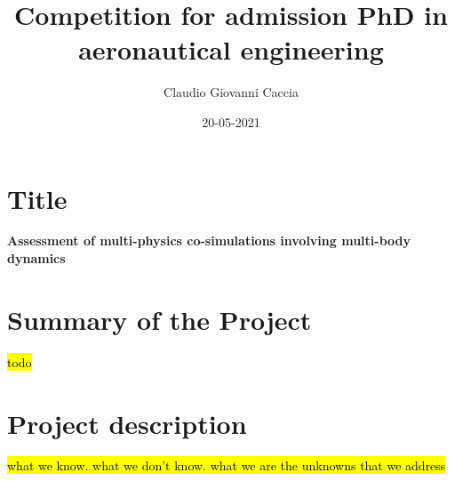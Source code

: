 \documentclass[a4paper]{article}
\title{Competition for admission PhD in \\ aeronautical engineering}
\author{Claudio Giovanni Caccia}
\date{20-05-2021}
\begin{document}
\maketitle

\section*{Title}

\textbf{Assessment of multi-physics co-simulations involving multi-body dynamics}

\section*{Summary of the Project}

\hl{todo}


\section*{Project description}





\hl{what we know. what we don't know. what we are the unknowns that we address}



\end{document}
